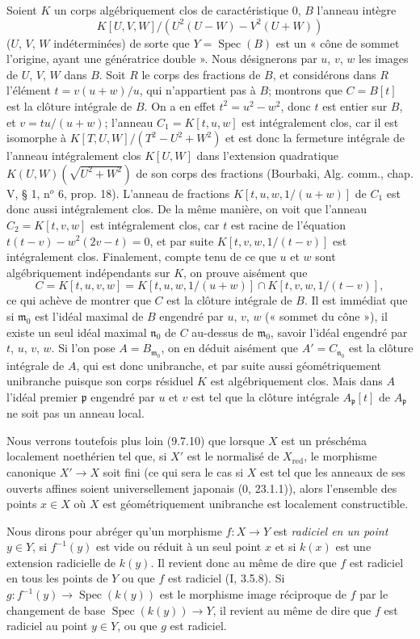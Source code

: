 Soient $K$ un corps algébriquement clos de caractéristique 0, $B$ l'anneau
intègre
\[
K[U,V,W]/(U^2(U-W)-V^2(U+W))
\]
($U$, $V$, $W$ indéterminées) de sorte que $Y=\operatorname{Spec}(B)$ est
un « cône de sommet l'origine, ayant une génératrice double ». Nous
désignerons par $u$, $v$, $w$ les images de $U$, $V$, $W$ dans $B$. Soit
$R$ le corps des fractions de $B$, et considérons dans $R$ l'élément
$t=v(u+w)/u$, qui n'appartient pas à $B$; montrons que $C=B[t]$ est la
clôture intégrale de $B$. On a en effet $t^2=u^2-w^2$, donc $t$ est entier
sur $B$, et $v=tu/(u+w)$; l'anneau $C_1=K[t,u,w]$ est intégralement clos,
car il est isomorphe à
$K[T,U,W]/(T^2-U^2+W^2)$ et est donc la fermeture intégrale de l'anneau
intégralement clos $K[U,W]$ dans l'extension quadratique
$K(U,W)(\sqrt{U^2+W^2})$ de son corps des fractions (Bourbaki, Alg. comm.,
chap. V, § 1, n$^o$ 6, prop. 18). L'anneau de fractions
$K[t,u,w,1/(u+w)]$ de $C_1$ est donc aussi intégralement clos. De la même
manière, on voit que l'anneau $C_2=K[t,v,w]$ est intégralement clos, car
$t$ est racine de l'équation
$t(t-v)-w^2(2v-t)=0$, et par suite
$K[t,v,w,1/(t-v)]$ est intégralement clos. Finalement, compte tenu de ce
que $u$ et $w$ sont algébriquement indépendants sur $K$, on prouve aisément
que
\[
C=K[t,u,v,w]=K[t,u,w,1/(u+w)]\cap K[t,v,w,1/(t-v)],
\]
ce qui achève de montrer que $C$ est la clôture intégrale de $B$. Il est
immédiat que si $\mathfrak m_0$ est l'idéal maximal de $B$ engendré par
$u$, $v$, $w$ (« sommet du cône »), il existe un seul idéal maximal
$\mathfrak n_0$ de $C$ au-dessus de $\mathfrak m_0$, savoir l'idéal
engendré par $t$, $u$, $v$, $w$. Si l'on pose $A=B_{\mathfrak m_0}$, on en
déduit aisément que $A'=C_{\mathfrak n_0}$ est la clôture intégrale de
$A$, qui est donc unibranche, et par suite aussi géométriquement unibranche
puisque son corps résiduel $K$ est algébriquement clos. Mais dans $A$
l'idéal premier $\mathfrak p$ engendré par $u$ et $v$ est tel que la
clôture intégrale $A_\mathfrak p[t]$ de $A_\mathfrak p$ ne soit pas un
anneau local.

Nous verrons toutefois plus loin (9.7.10) que lorsque $X$ est un préschéma
localement noethérien tel que, si $X'$ est le normalisé de
$X_{\mathrm{red}}$, le morphisme canonique $X'\to X$ soit fini (ce qui sera
le cas si $X$ est tel que les anneaux de ses ouverts affines soient
universellement japonais (0, 23.1.1)), alors l'ensemble des points $x\in X$
où $X$ est géométriquement unibranche est localement constructible.

\begin{env}[6.15.3]
\label{IV.2.s6.15.3-fr}
Nous dirons pour abréger qu'un morphisme $f:X\to Y$ est \emph{radiciel en
un point} $y\in Y$, si $f^{-1}(y)$ est vide ou réduit à un seul point $x$
et si $k(x)$ est une extension radicielle de $k(y)$. Il revient donc au
même de dire que $f$ est radiciel en tous les points de $Y$ ou que $f$ est
radiciel (I, 3.5.8). Si
$g:f^{-1}(y)\to\operatorname{Spec}(k(y))$ est le morphisme image réciproque
de $f$ par le changement de base
$\operatorname{Spec}(k(y))\to Y$, il revient au même de dire que $f$ est
radiciel au point $y\in Y$, ou que $g$ est radiciel.
\end{env}


